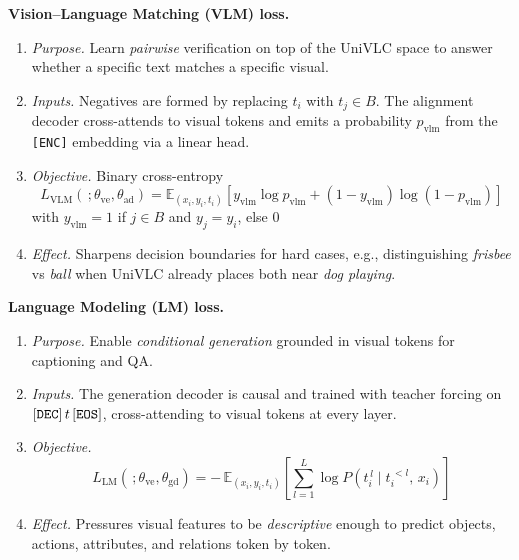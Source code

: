 \begin{enrichment}
\begin{enrichment}
        \noindent\textbf{Vision–Language Matching (VLM) loss.}
        \begin{enumerate}
            \item \textit{Purpose.} Learn \emph{pairwise} verification on top of the UniVLC space to answer whether a specific text matches a specific visual.
            \item \textit{Inputs.} Negatives are formed by replacing \(t_i\) with \(t_j\in B\). The alignment decoder cross-attends to visual tokens and emits a probability \(p_{\mathrm{vlm}}\) from the \texttt{[ENC]} embedding via a linear head.
            \item \textit{Objective.} Binary cross-entropy
            \[
            L_{\mathrm{VLM}}(\,;\theta_{\mathrm{ve}},\theta_{\mathrm{ad}})=\mathbb{E}_{(x_i,y_i,t_i)}\!\left[y_{\mathrm{vlm}}\log p_{\mathrm{vlm}}+(1-y_{\mathrm{vlm}})\log(1-p_{\mathrm{vlm}})\right]
            \tag{3}
            \]
            with \(y_{\mathrm{vlm}}{=}1\) if \(j\in B\) and \(y_j=y_i\), else \(0\)
            \item \textit{Effect.} Sharpens decision boundaries for hard cases, e.g., distinguishing \textit{frisbee} vs \textit{ball} when UniVLC already places both near \textit{dog playing}.
        \end{enumerate}
        
        \noindent\textbf{Language Modeling (LM) loss.}
        \begin{enumerate}
            \item \textit{Purpose.} Enable \emph{conditional generation} grounded in visual tokens for captioning and QA.
            \item \textit{Inputs.} The generation decoder is causal and trained with teacher forcing on \([{\tt DEC}]\, t \,[{\tt EOS}]\), cross-attending to visual tokens at every layer.
            \item \textit{Objective.}
            \[
            L_{\mathrm{LM}}(\,;\theta_{\mathrm{ve}},\theta_{\mathrm{gd}})
            =-\,\mathbb{E}_{(x_i,y_i,t_i)}\!\left[\sum_{l=1}^{L}\log P\!\left(t_{i}^{\,l}\mid t_{i}^{\,<l},\,x_i\right)\right]
            \tag{4}
            \]
            \item \textit{Effect.} Pressures visual features to be \emph{descriptive} enough to predict objects, actions, attributes, and relations token by token.
        \end{enumerate}
        

\end{enrichment}
\end{enrichment}
